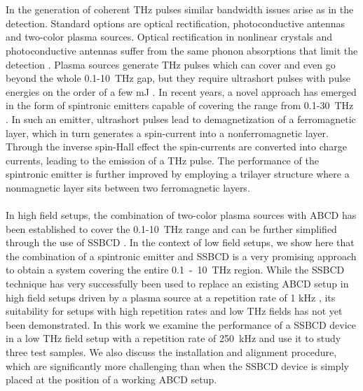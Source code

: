 \documentclass{article}
\begin{document}
\\~\\
In the generation of coherent THz pulses similar bandwidth issues arise as in the detection. Standard options are optical rectification, photoconductive antennas and two-color plasma sources. Optical rectification in nonlinear crystals and photoconductive antennas suffer from the same phonon absorptions that limit the detection \cite{lee-2008, jepsen-2005}. Plasma sources generate THz pulses which can cover and even go beyond the whole \mbox{0.1-10 THz} gap, but they require ultrashort pulses with pulse energies on the order of a few mJ \cite{cook-2000, thomson-2010, clerici-2013}. In recent years, a novel approach has emerged in the form of spintronic emitters capable of covering the range from \mbox{0.1-30 THz} \cite{seifert-2016, seifert-2017}. In such an emitter, ultrashort pulses lead to demagnetization of a ferromagnetic layer, which in turn generates a spin-current into a nonferromagnetic layer. Through the inverse spin-Hall effect the spin-currents are converted into charge currents, leading to the emission of a THz pulse. The performance of the spintronic emitter is further improved by employing a trilayer structure where a nonmagnetic layer sits between two ferromagnetic layers. 
\\~\\
In high field setups, the combination of two-color plasma sources with ABCD has been established to cover the \mbox{0.1-10 THz} range and can be further simplified through the use of SSBCD \cite{tomasino-2017, tomasino-2018, tomasino-2021}. In the context of low field setups, we show here that the combination of a spintronic emitter and SSBCD is a very promising approach to obtain a system covering the entire \mbox{0.1 - 10 THz} region. While the SSBCD technique has very successfully been used to replace an existing ABCD setup in high field setups driven by a plasma source at a repetition rate of 1 kHz \cite{tomasino-2017, tomasino-2018, tomasino-2021}, its suitability for setups with high repetition rates and low THz fields has not yet been demonstrated. In this work we examine the performance of a SSBCD device in a low THz field setup with a repetition rate of \mbox{250 kHz} and use it to study three test samples. We also discuss the installation and alignment procedure, which are significantly more challenging than when the SSBCD device is simply placed at the position of a working ABCD setup.
\end{document}
